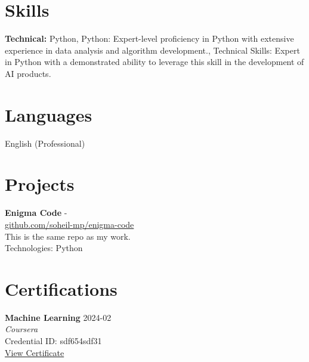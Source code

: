 \documentclass[11pt,a4paper]{article}
\begin{document}

\section*{Skills}

\textbf{Technical:} Python, Python: Expert-level proficiency in Python with extensive experience in data analysis and algorithm development., Technical Skills: Expert in Python with a demonstrated ability to leverage this skill in the development of AI products.\\



\section*{Languages}
English (Professional)


\section*{Projects}

\noindent\textbf{Enigma Code} \hfill  - \\
\href{github.com/soheil-mp/enigma-code}{github.com/soheil-mp/enigma-code}\\
This is the same repo as my work.\\
Technologies: Python\\
\begin{itemize}

\end{itemize}



\section*{Certifications}

\noindent\textbf{Machine Learning} \hfill 2024-02\\
\textit{Coursera}\\
Credential ID: sdf654sdf31\\
\href{someurl.com}{View Certificate}\\
\end{document}
